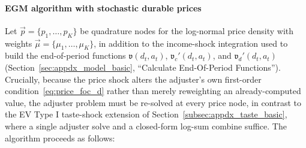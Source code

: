 \paragraph{EGM algorithm with stochastic durable prices}
Let $\vec p = \{p_1,\dots,p_K\}$ be quadrature nodes for the log-normal price density with weights $\vec\mu=\{\mu_1,\dots,\mu_K\}$, in addition to the income-shock integration used to build the end-of-period functions $\mathfrak{v}(d_t,a_t)$, $\mathfrak{v}_c'(d_t,a_t)$, and $\mathfrak{v}_d'(d_t,a_t)$ (Section~\ref{sec:appdx_model_basic}, ``Calculate End-Of-Period Functions''). Crucially, because the price shock alters the adjuster's own first-order condition~\eqref{eq:price_foc_d} rather than merely reweighting an already-computed value, the adjuster problem must be re-solved at every price node, in contrast to the EV Type I taste-shock extension of Section~\ref{subsec:appdx_taste_basic}, where a single adjuster solve and a closed-form log-sum combine suffice. The algorithm proceeds as follows:
